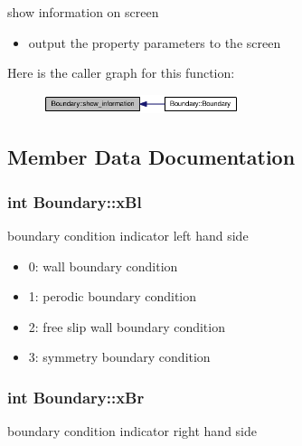 show information on screen 



\begin{itemize}
\item output the property parameters to the screen \end{itemize}


Here is the caller graph for this function:\nopagebreak
\begin{figure}[H]
\begin{center}
\leavevmode
\includegraphics[width=162pt]{classBoundary_116df4b717184d962f40bdc88de26763_icgraph}
\end{center}
\end{figure}


\subsection{Member Data Documentation}
\hypertarget{classBoundary_10dd58ba0715412968c4902fe80b1318}{
\subsubsection[{xBl}]{\setlength{\rightskip}{0pt plus 5cm}int {\bf Boundary::xBl}}}
\label{classBoundary_10dd58ba0715412968c4902fe80b1318}


boundary condition indicator left hand side 

\begin{itemize}
\item 0: wall boundary condition\item 1: perodic boundary condition\item 2: free slip wall boundary condition\item 3: symmetry boundary condition \end{itemize}
\hypertarget{classBoundary_4a582b489cb580b8a6f3a7123f411a53}{
\subsubsection[{xBr}]{\setlength{\rightskip}{0pt plus 5cm}int {\bf Boundary::xBr}}}
\label{classBoundary_4a582b489cb580b8a6f3a7123f411a53}


boundary condition indicator right hand side 

